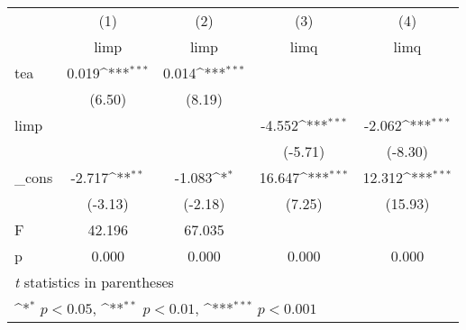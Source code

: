 {
\def\sym#1{\ifmmode^{#1}\else\(^{#1}\)\fi}
\begin{tabular}{l*{4}{c}}
\toprule
            &\multicolumn{1}{c}{(1)}&\multicolumn{1}{c}{(2)}&\multicolumn{1}{c}{(3)}&\multicolumn{1}{c}{(4)}\\
            &\multicolumn{1}{c}{limp}&\multicolumn{1}{c}{limp}&\multicolumn{1}{c}{limq}&\multicolumn{1}{c}{limq}\\
\midrule
tea         &       0.019\sym{***}&       0.014\sym{***}&                     &                     \\
            &      (6.50)         &      (8.19)         &                     &                     \\
\addlinespace
limp        &                     &                     &      -4.552\sym{***}&      -2.062\sym{***}\\
            &                     &                     &     (-5.71)         &     (-8.30)         \\
\addlinespace
\_cons      &      -2.717\sym{**} &      -1.083\sym{*}  &      16.647\sym{***}&      12.312\sym{***}\\
            &     (-3.13)         &     (-2.18)         &      (7.25)         &     (15.93)         \\
\midrule
F           &      42.196         &      67.035         &                     &                     \\
p           &       0.000         &       0.000         &       0.000         &       0.000         \\
\bottomrule
\multicolumn{5}{l}{\footnotesize \textit{t} statistics in parentheses}\\
\multicolumn{5}{l}{\footnotesize \sym{*} \(p<0.05\), \sym{**} \(p<0.01\), \sym{***} \(p<0.001\)}\\
\end{tabular}
}
